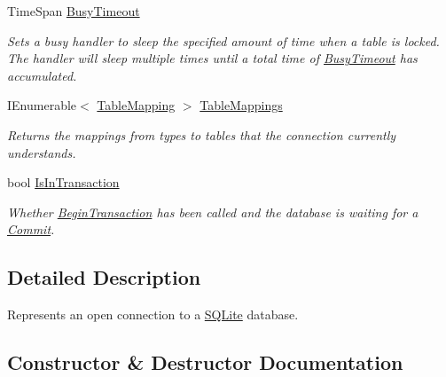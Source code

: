 \begin{DoxyCompactItemize}
\item 
Time\+Span \hyperlink{classSQLite_1_1SQLiteConnection_abb2b70df282aa2f1af07789db65db1dd}{Busy\+Timeout}
\begin{DoxyCompactList}\small\item\em Sets a busy handler to sleep the specified amount of time when a table is locked. The handler will sleep multiple times until a total time of \hyperlink{classSQLite_1_1SQLiteConnection_abb2b70df282aa2f1af07789db65db1dd}{Busy\+Timeout} has accumulated. \end{DoxyCompactList}\item 
I\+Enumerable$<$ \hyperlink{classSQLite_1_1TableMapping}{Table\+Mapping} $>$ \hyperlink{classSQLite_1_1SQLiteConnection_ac0c3b1e8f8060ef9777fac08751d159e}{Table\+Mappings}
\begin{DoxyCompactList}\small\item\em Returns the mappings from types to tables that the connection currently understands. \end{DoxyCompactList}\item 
bool \hyperlink{classSQLite_1_1SQLiteConnection_a9450dfedb603c08eb75f57f36db41d9b}{Is\+In\+Transaction}
\begin{DoxyCompactList}\small\item\em Whether \hyperlink{classSQLite_1_1SQLiteConnection_aba3becdb524808bd49f349587f1b7049}{Begin\+Transaction} has been called and the database is waiting for a \hyperlink{classSQLite_1_1SQLiteConnection_a2c8187a19b5065f6b23c079e7cca29fe}{Commit}. \end{DoxyCompactList}\end{DoxyCompactItemize}


\subsection{Detailed Description}
Represents an open connection to a \hyperlink{namespaceSQLite}{S\+Q\+Lite} database. 



\subsection{Constructor \& Destructor Documentation}
\hypertarget{classSQLite_1_1SQLiteConnection_a21204da14d0e2a44039f3395bb4ff12d}{}
